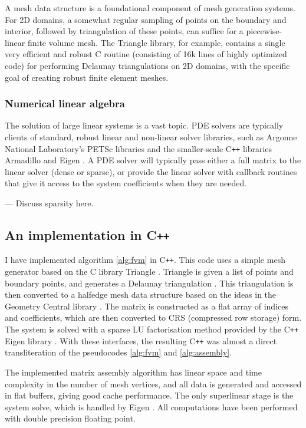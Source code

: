 A mesh data structure is a foundational component of mesh generation systems. For 2D domains, a somewhat regular sampling of points on the boundary
and interior, followed by triangulation of these points, can suffice for a piecewise-linear finite volume mesh.
The Triangle \cite{triangle} library, for example, contains a single very efficient and robust C routine (consisting of 16k lines of highly optimized code)
for performing Delaunay triangulations \cite{orourke}
on 2D domains,
with the specific goal of creating robust finite element meshes.

\subsubsection{Numerical linear algebra}
The solution of large linear systems is a vast topic. PDE solvers are typically clients
of standard, robust linear and non-linear solver libraries, such as Argonne National Laboratory's PETSc libraries \cite{petsc}
and the smaller-scale C\texttt{++} libraries Armadillo \cite{armadillo} and Eigen \cite{eigen}.
A PDE solver will typically pass either a full matrix to the linear solver (dense or sparse),
or provide the linear solver with callback routines that give it access to the system coefficients when they are needed.

--- Discuss sparsity here.

\subsection{An implementation in C\texttt{++}}
I have implemented algorithm \ref{alg:fvm} in C\texttt{++}.
This code uses a simple mesh generator based on the C library Triangle \cite{triangle}. Triangle is given a list of points
and boundary points, and generates a Delaunay triangulation \cite{orourke}. This triangulation is then converted to a halfedge mesh data structure
based on the ideas in the Geometry Central library \cite{geometry_central}.
The matrix is constructed as a flat array of indices and coefficients, which are then converted to CRS (compressed row storage) form.
The system is solved with a sparse LU factorisation method provided by the C\texttt{++} Eigen library \cite{eigen}.
With these interfaces, the resulting C\texttt{++} was almost a direct transliteration of the pseudocodes \ref{alg:fvm} and \ref{alg:assembly}.

The implemented matrix assembly algorithm has linear space and time complexity in the number of mesh vertices,
and all data is generated and accessed in flat buffers, giving good cache performance.
The only superlinear stage is the system solve, which is handled by Eigen \cite{eigen}.
All computations have been performed with double precision floating point.


